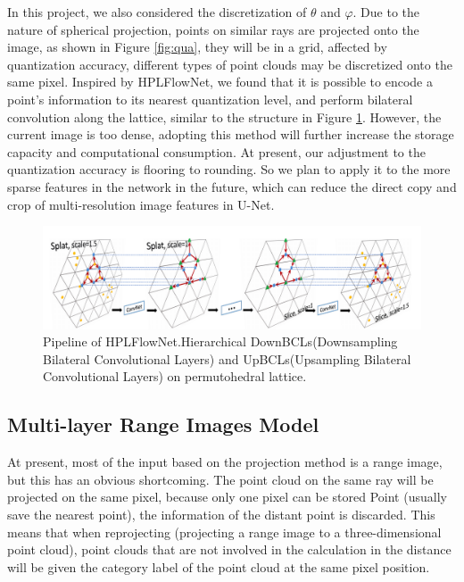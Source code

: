 \documentclass[final]{cvpr}
\begin{document}
In this project, we also considered the discretization of $\theta$ and $\varphi$.  Due to the nature of spherical projection, points on similar rays are projected onto the image, as shown in Figure \ref{fig:qua}, they will be in a grid, affected by quantization accuracy, different types of point clouds may be discretized onto the same pixel. Inspired by HPLFlowNet\cite{hplf}, we found that it is possible to encode a point's information to its nearest quantization level, and perform bilateral convolution along the lattice, similar to the structure in Figure \ref{fig:flow}. However, the current image is too dense, adopting this method will further increase the storage capacity and computational consumption. At present, our adjustment to the quantization accuracy is flooring to rounding. So we plan to apply it to the more sparse features in the network in the future, which can reduce the direct copy and crop of multi-resolution image features in U-Net. 
\begin{figure}[b]
\begin{center}
   \includegraphics[width=1\linewidth]{latex/flow.png}
\end{center}
   \caption{Pipeline of HPLFlowNet\cite{hplf}.Hierarchical DownBCLs(Downsampling Bilateral Convolutional Layers) and UpBCLs(Upsampling Bilateral Convolutional Layers) on permutohedral lattice.}
\label{fig:flow}
\end{figure}

\subsection{Multi-layer Range Images Model}
At present, most of the input based on the projection method is a range image, but this has an obvious shortcoming. The point cloud on the same ray will be projected on the same pixel, because only one pixel can be stored  Point (usually save the nearest point), the information of the distant point is discarded.  This means that when reprojecting (projecting a range image to a three-dimensional point cloud), point clouds that are not involved in the calculation in the distance will be given the category label of the point cloud at the same pixel position.
\end{document}
